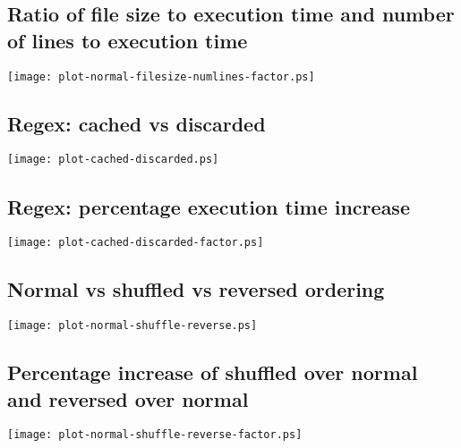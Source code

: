 \documentclass[a4paper,12pt,draft]{article}
\begin{document}
\subsection{Ratio of file size to execution time and number of lines to
execution time}
\label{execution time vs file size vs number lines factor}
\texttt{[image: plot-normal-filesize-numlines-factor.ps]}


\subsection{Regex: cached vs discarded}
\label{normal regex vs discard regex}
\texttt{[image: plot-cached-discarded.ps]}


\subsection{Regex: percentage execution time increase}
\label{normal regex vs disarded regex factor}
\texttt{[image: plot-cached-discarded-factor.ps]}


\subsection{Normal vs shuffled vs reversed ordering}
\label{normal vs shuffled vs reversed ordering}
\texttt{[image: plot-normal-shuffle-reverse.ps]}

\subsection{Percentage increase of shuffled over normal and reversed over
normal}
\label{normal vs shuffled vs reversed ordering factor}
\texttt{[image: plot-normal-shuffle-reverse-factor.ps]}
\end{document}

